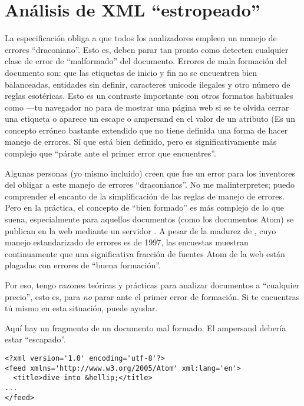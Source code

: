 \section{Análisis de XML ``estropeado''}

La especificación  obliga a que todos los analizadores  empleen un manejo de errores ``draconiano''. Esto es, deben parar tan pronto como detecten cualquier clase de error de ``malformado'' del documento. Errores de mala formación del documento son: que las etiquetas de inicio y fin no se encuentren bien balanceadas, entidades sin definir, caracteres unicode ilegales y otro número de reglas esotéricas. Esto es un contraste importante con otros formatos habituales como  ---tu navegador no para de mostrar una página web si se te olvida cerrar una etiqueta  o aparece un escape o ampersand en el valor de un atributo (Es un concepto erróneo bastante extendido que  no tiene definida una forma de hacer manejo de errores. Sí que está bien definido, pero es significativamente más complejo que ``párate ante el primer error que encuentres''.

Algunas personas (yo mismo incluido) creen que fue un error para los inventores del  obligar a este manejo de errores ``draconianos''. No me malinterpretes; puedo comprender el encanto de la simplificación de las reglas de manejo de errores. Pero en la práctica, el concepto de ``bien formado'' es más complejo de lo que suena, especialmente para aquellos documentos  (como los documentos Atom) se publican en la web mediante un servidor . A pesar de la madurez de , cuyo manejo estandarizado de errores es de 1997, las encuestas muestran continuamente que una significativa fracción de fuentes Atom de la web están plagadas con errores de ``buena formación''.

Por eso, tengo razones teóricas y prácticas para analizar documentos  a ``cualquier precio'', esto es, para \emph{no} parar ante el primer error de formación. Si te encuentras tú mismo en esta situación,  puede ayudar.

Aquí hay un fragmento de un documento  mal formado. El ampersand debería estar ``escapado''.

\noindent\begin{minipage}{\textwidth}
\begin{lstlisting}[mathescape=True]
<?xml version='1.0' encoding='utf-8'?>
<feed xmlns='http://www.w3.org/2005/Atom' xml:lang='en'>
  <title>dive into &hellip;</title>
...
</feed>
\end{lstlisting}
\end{minipage}

